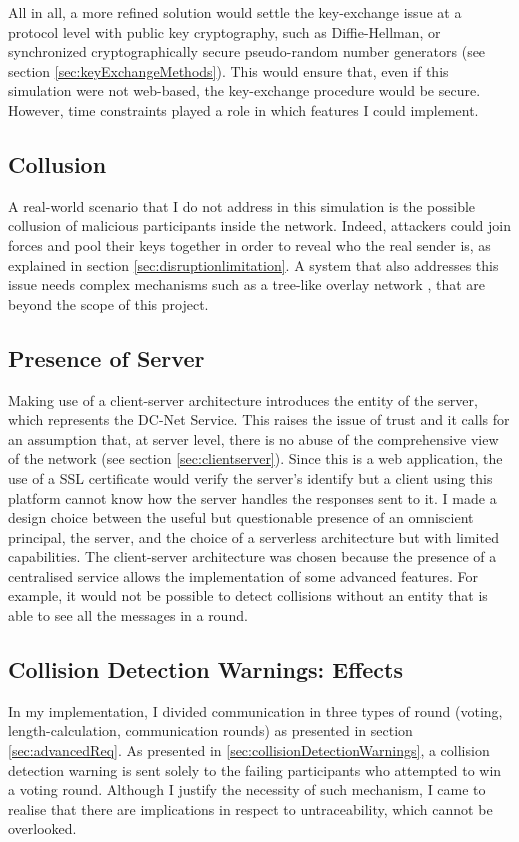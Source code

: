 All in all, a more refined solution would settle the key-exchange issue at a protocol level with public key cryptography, such as Diffie-Hellman, or synchronized cryptographically secure pseudo-random number generators (see section \ref{sec:keyExchangeMethods}). This would ensure that, even if this simulation were not web-based, the key-exchange procedure would be secure. However, time constraints played a role in which features I could implement.

\subsection{Collusion}
A real-world scenario that I do not address in this simulation is the possible collusion of malicious participants inside the network. Indeed, attackers could join forces and pool their keys together in order to reveal who the real sender is, as explained in section \ref{sec:disruptionlimitation}. A system that also addresses this issue needs complex mechanisms such as a tree-like overlay network \cite{Wang}, that are beyond the scope of this project.

\subsection{Presence of Server} \label{sec:evalServerPresence}
Making use of a client-server architecture introduces the entity of the server, which represents the DC-Net Service. This raises the issue of trust and it calls for an assumption that, at server level, there is no abuse of the comprehensive view of the network (see section \ref{sec:clientserver}). Since this is a web application, the use of a SSL certificate would verify the server's identify but a client using this platform cannot know how the server handles the responses sent to it. I made a design choice between the useful but questionable presence of an omniscient principal, the server, and the choice of a serverless architecture but with limited capabilities. The client-server architecture was chosen because the presence of a centralised service allows the implementation of some advanced features. For example, it would not be possible to detect collisions without an entity that is able to see all the messages in a round.

\subsection{Collision Detection Warnings: Effects}
In my implementation, I divided communication in three types of round (voting, length-calculation, communication rounds) as presented in section \ref{sec:advancedReq}.
As presented in \ref{sec:collisionDetectionWarnings}, a collision detection warning is sent solely to the failing participants who attempted to win a voting round. Although I justify the necessity of such mechanism, I came to realise that there are implications in respect to untraceability, which cannot be overlooked.


